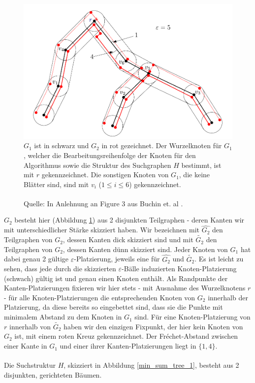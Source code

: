 \documentclass[a4paper, 12pt, twoside]{article}
\theoremstyle{Format1} %
\begin{document}
\begin{figure}[H]
    \includegraphics[width=\textwidth]{min_sum_tree_0.pdf}
	\caption{
	$G_1$ ist in schwarz und $G_2$ in rot gezeichnet. Der Wurzelknoten für $G_1$, welcher die Bearbeitungsreihenfolge der Knoten für den Algorithmus sowie die Struktur
	des Suchgraphen $H$ bestimmt, ist mit $r$ gekennzeichnet. Die sonstigen Knoten von $G_1$, die keine Blätter sind, sind mit $v_i$ ($1 \leq i \leq 6$) gekennzeichnet.
	\\
	\\
	Quelle: In Anlehnung an Figure 3 aus Buchin et. al \cite{Buchin}.
	}
    \label{min_sum_tree_0}
\end{figure}

$G_2$ besteht hier (Abbildung \ref{min_sum_tree_0}) aus 2 disjunkten Teilgraphen - deren Kanten wir mit unterschiedlicher Stärke skizziert haben.
Wir bezeichnen mit $\widehat{G_2}$ den Teilgraphen von $G_2$, dessen Kanten dick skizziert sind und mit $\widetilde{G_2}$ den Teilgraphen von $G_2$, dessen Kanten dünn skizziert sind.
Jeder Knoten von $G_1$ hat dabei genau 2 gültige $\varepsilon$-Platzierung, jeweils eine für $\widehat{G_2}$ und $\widetilde{G_2}$.
Es ist leicht zu sehen, dass jede durch die skizzierten $\varepsilon$-Bälle induzierten Knoten-Platzierung (schwach) gültig ist und genau einen Knoten enthält.
Als Randpunkte der Kanten-Platzierungen fixieren wir hier stets - mit Ausnahme des Wurzelknotens $r$ - für alle Knoten-Platzierungen die entsprechenden Knoten von $G_2$ innerhalb der Platzierung,
da diese bereits so eingebettet sind, dass sie die Punkte mit minimalem Abstand zu dem Knoten in $G_1$ sind. Für eine Knoten-Platzierung von $r$ innerhalb von $\widetilde{G_2}$
haben wir den einzigen Fixpunkt, der hier kein Knoten von $G_2$ ist, mit einem roten Kreuz gekennzeichnet.
Der Fréchet-Abstand zwischen einer Kante in $G_1$ und einer ihrer Kanten-Platzierungen liegt in $\{1,4\}$.
\\
\\
Die Suchstruktur $H$, skizziert in Abbildung \ref{min_sum_tree_1}, besteht aus 2 disjunkten, gerichteten Bäumen.
\end{document}
